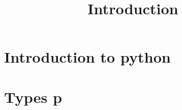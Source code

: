 \documentclass[10pt]{article}
\title{Introduction}
\date{}
\begin{document}
	
	\maketitle	
	\section{Introduction to python}
	\section{Types p}
\end{document}
